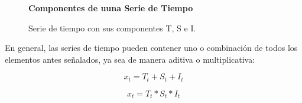 \begin{figure}[H]
	\centering
	\textbf{Componentes de uuna Serie de Tiempo}\par\medskip
	\caption{Serie de tiempo con sus componentes T, S e I.}\label{figura10}
\end{figure}

En general, las series de tiempo pueden contener uno o combinaci\'on de todos los elementos antes se\~nalados, ya sea de manera aditiva o multiplicativa:

\begin{equation*}
x_t = T_t + S_t + I_t
\end{equation*}

\begin{equation*}
x_t = T_t * S_t * I_t
\end{equation*}

